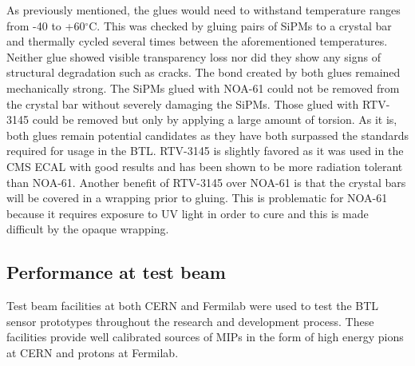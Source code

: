As previously mentioned, the glues would need to withstand temperature ranges from -40 to +60$^\circ$C.  This was checked by gluing pairs of SiPMs to a crystal bar and thermally cycled several times between the aforementioned temperatures.  Neither glue showed visible transparency loss nor did they show any signs of structural degradation such as cracks.  The bond created by both glues remained mechanically strong.  The SiPMs glued with NOA-61 could not be removed from the crystal bar without severely damaging the SiPMs.  Those glued with RTV-3145 could be removed but only by applying a large amount of torsion.  As it is, both glues remain potential candidates as they have both surpassed the standards required for usage in the BTL.  RTV-3145 is slightly favored as it was used in the CMS ECAL with good results and has been shown to be more radiation tolerant than NOA-61.  Another benefit of RTV-3145 over NOA-61 is that the crystal bars will be covered in a wrapping prior to gluing.  This is problematic for NOA-61 because it requires exposure to UV light in order to cure and this is made difficult by the opaque wrapping.  

\subsection{Performance at test beam}

Test beam facilities at both CERN and Fermilab were used to test the BTL sensor prototypes throughout the research and development process.  These facilities provide well calibrated sources of MIPs in the form of high energy pions at CERN and protons at Fermilab.  

